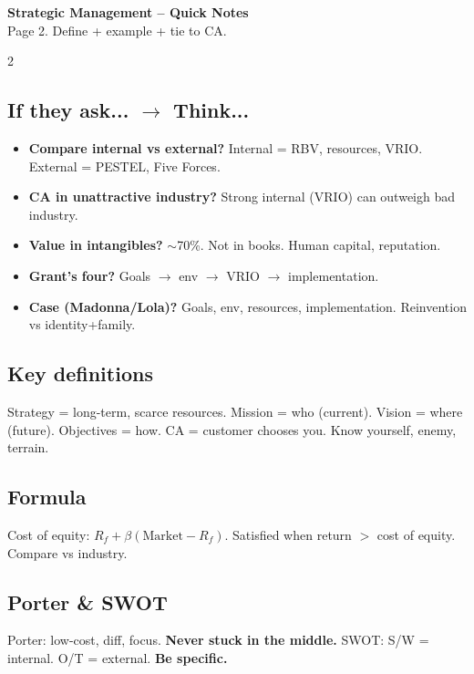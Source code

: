 \documentclass[10pt,landscape,a4paper]{article}
\begin{document}
\newpage
\begin{center}
{\LARGE\bfseries\color{accent} Strategic Management -- Quick Notes}\\[0.3em]
\small Page 2. Define + example + tie to CA.
\end{center}
\vspace{0.5em}
\begin{multicols}{2}
\subsection*{\color{accent} If they ask... $\to$ Think...}
\begin{itemize}[leftmargin=*,nosep]
\item \textbf{Compare internal vs external?} Internal = RBV, resources, VRIO. External = PESTEL, Five Forces.
\item \textbf{CA in unattractive industry?} Strong internal (VRIO) can outweigh bad industry.
\item \textbf{Value in intangibles?} $\sim$70\%. Not in books. Human capital, reputation.
\item \textbf{Grant's four?} Goals $\to$ env $\to$ VRIO $\to$ implementation.
\item \textbf{Case (Madonna/Lola)?} Goals, env, resources, implementation. Reinvention vs identity+family.
\end{itemize}

\subsection*{\color{accent} Key definitions}
Strategy = long-term, scarce resources. Mission = who (current). Vision = where (future). Objectives = how. CA = customer chooses you. Know yourself, enemy, terrain.

\subsection*{\color{accent} Formula}
Cost of equity: $R_f + \beta(\text{Market} - R_f)$. Satisfied when return $>$ cost of equity. Compare vs industry.

\subsection*{\color{accent} Porter \& SWOT}
Porter: low-cost, diff, focus. \textbf{Never stuck in the middle.} SWOT: S/W = internal. O/T = external. \textbf{Be specific.}


\end{multicols}
\end{document}
